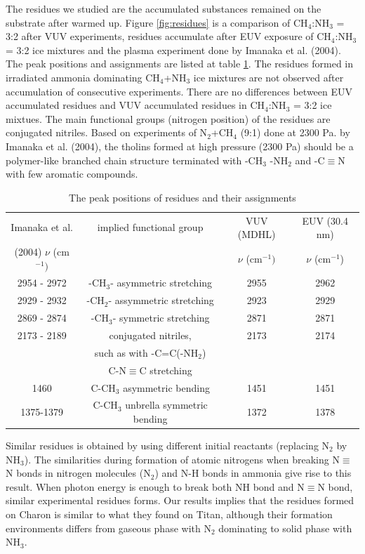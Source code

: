 The residues we studied are the accumulated substances remained on the substrate after warmed up. Figure \ref{fig:residues} is a comparison of CH$_4$:NH$_3$ = 3:2 after VUV experiments, residues accumulate after EUV exposure of CH$_4$:NH$_3$ = 3:2 ice mixtures and the plasma experiment done by Imanaka et al. (2004)\cite{imanaka2004laboratory}. The peak positions and assignments are listed at table \ref{tab:residue}. The residues formed in irradiated ammonia dominating CH$_4$+NH$_3$ ice mixtures are not observed after accumulation of consecutive experiments. There are no differences between EUV accumulated residues and VUV accumulated residues in CH$_4$:NH$_3$ = 3:2 ice mixtues. The main functional groups (nitrogen position) of the residues are conjugated nitriles. Based on experiments of N$_2$+CH$_4$ (9:1) done at 2300 Pa. by Imanaka et al. (2004)\cite{imanaka2004laboratory}, the tholins formed at high pressure (2300 Pa) should be a polymer-like branched chain structure terminated with -CH$_3$ -NH$_2$ and -C$\equiv$N with few aromatic compounds.\\

\begin{table}[htbp]
\caption{The peak positions of residues and their assignments}
\label{tab:residue}
\begin{tabular}{cccc}
\hline
\hline
Imanaka et al. & implied functional group & VUV (MDHL) & EUV (30.4 nm)\\
(2004) $\nu$ (cm$^{-1})$ & & $\nu$ (cm$^{-1})$ & $\nu$ (cm$^{-1}$) \\
\hline
2954 - 2972 & -CH$_3$- asymmetric stretching & 2955 & 2962 \\
2929 - 2932 & -CH$_2$- assymmetric stretching & 2923 & 2929 \\
2869 - 2874 & -CH$_3$- symmetric stretching & 2871 & 2871 \\
2173 - 2189 & conjugated nitriles, & 2173 & 2174 \\
 & such as with -C=C(-NH$_2$)& & \\
 & C-N$\equiv$C stretching& & \\
1460 & C-CH$_3$ asymmetric bending & 1451 & 1451 \\
1375-1379 & C-CH$_3$ unbrella symmetric bending & 1372 & 1378 \\
\hline
\end{tabular}
\end{table}

Similar residues is obtained by using different initial reactants (replacing N$_2$ by NH$_3$). The similarities during formation of atomic nitrogens when breaking N$\equiv$N bonds in nitrogen molecules (N$_2$) and N-H bonds in ammonia give rise to this result. When photon energy is enough to break both NH bond and N$\equiv$N bond, similar experimental residues forms. Our results implies that the residues formed on Charon is similar to what they found on Titan, although their formation environments differs from gaseous phase with N$_2$ dominating to solid phase with NH$_3$.\\


